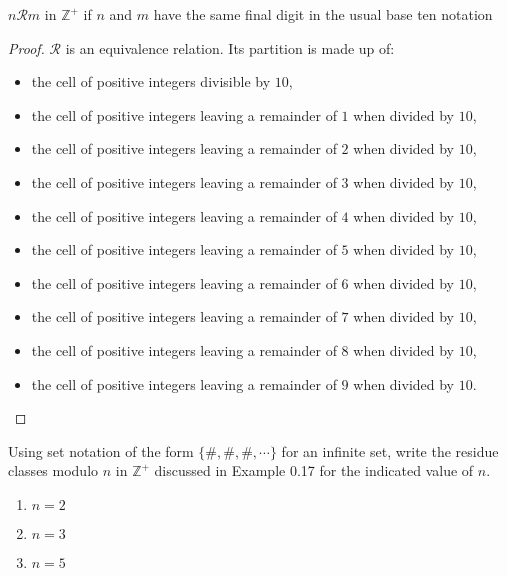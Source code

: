 \begin{exercise}
    $n\mathscr{R}m$ in $\mathbb{Z}^{+}$ if $n$ and $m$ have the same final digit in the usual base ten notation
\end{exercise}

\begin{proof}
    $\mathscr{R}$ is an equivalence relation. Its partition is made up of:
    \begin{itemize}
        \item the cell of positive integers divisible by $10$,
        \item the cell of positive integers leaving a remainder of $1$ when divided by $10$,
        \item the cell of positive integers leaving a remainder of $2$ when divided by $10$,
        \item the cell of positive integers leaving a remainder of $3$ when divided by $10$,
        \item the cell of positive integers leaving a remainder of $4$ when divided by $10$,
        \item the cell of positive integers leaving a remainder of $5$ when divided by $10$,
        \item the cell of positive integers leaving a remainder of $6$ when divided by $10$,
        \item the cell of positive integers leaving a remainder of $7$ when divided by $10$,
        \item the cell of positive integers leaving a remainder of $8$ when divided by $10$,
        \item the cell of positive integers leaving a remainder of $9$ when divided by $10$.
    \end{itemize}
\end{proof}

\begin{exercise}
    Using set notation of the form $\{ \#, \#, \#, \cdots \}$ for an infinite set, write the residue classes modulo $n$ in $\mathbb{Z}^{+}$ discussed in Example 0.17 for the indicated value of $n$.
    \begin{enumerate}[label={\textbf{\alph*.}},itemsep=0pt]
        \item $n = 2$
        \item $n = 3$
        \item $n = 5$
    \end{enumerate}
\end{exercise}

